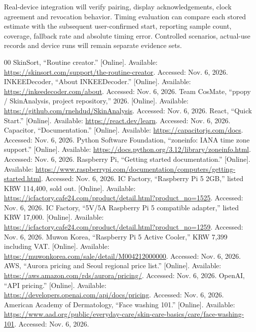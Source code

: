\documentclass[conference,letterpaper]{IEEEtran}
\begin{document}
Real-device integration will verify pairing, display acknowledgements, clock agreement and revocation behavior. Timing evaluation can compare each stored estimate with the subsequent user-confirmed start, reporting sample count, coverage, fallback rate and absolute timing error. Controlled scenarios, actual-use records and device runs will remain separate evidence sets.
\begin{thebibliography}{00}
 SkinSort, ``Routine creator.'' [Online]. Available: \url{https://skinsort.com/support/the-routine-creator}. Accessed: Nov. 6, 2026.
 INKEEDecoder, ``About INKEEDecoder.'' [Online]. Available: \url{https://inkeedecoder.com/about}. Accessed: Nov. 6, 2026.
 Team CosMate, ``ppopy / SkinAnalysis, project repository,'' 2026. [Online]. Available: \url{https://github.com/rnehdud/SkinAnalysis}. Accessed: Nov. 6, 2026.
 React, ``Quick Start.'' [Online]. Available: \url{https://react.dev/learn}. Accessed: Nov. 6, 2026.
 Capacitor, ``Documentation.'' [Online]. Available: \url{https://capacitorjs.com/docs}. Accessed: Nov. 6, 2026.
 Python Software Foundation, ``zoneinfo: IANA time zone support.'' [Online]. Available: \url{https://docs.python.org/3.12/library/zoneinfo.html}. Accessed: Nov. 6, 2026.
 Raspberry Pi, ``Getting started documentation.'' [Online]. Available: \url{https://www.raspberrypi.com/documentation/computers/getting-started.html}. Accessed: Nov. 6, 2026.
 IC Factory, ``Raspberry Pi 5 2GB,'' listed KRW 114,400, sold out. [Online]. Available: \url{https://icfactory.cafe24.com/product/detail.html?product_no=1525}. Accessed: Nov. 6, 2026.
 IC Factory, ``5V/5A Raspberry Pi 5 compatible adapter,'' listed KRW 17,000. [Online]. Available: \url{https://icfactory.cafe24.com/product/detail.html?product_no=1259}. Accessed: Nov. 6, 2026.
 Muwon Korea, ``Raspberry Pi 5 Active Cooler,'' KRW 7,399 including VAT. [Online]. Available: \url{https://muwonkorea.com/sale/detail/M004212000000}. Accessed: Nov. 6, 2026.
 AWS, ``Aurora pricing and Seoul regional price list.'' [Online]. Available: \url{https://aws.amazon.com/rds/aurora/pricing/}. Accessed: Nov. 6, 2026.
 OpenAI, ``API pricing.'' [Online]. Available: \url{https://developers.openai.com/api/docs/pricing}. Accessed: Nov. 6, 2026.
 American Academy of Dermatology, ``Face washing 101.'' [Online]. Available: \url{https://www.aad.org/public/everyday-care/skin-care-basics/care/face-washing-101}. Accessed: Nov. 6, 2026.
\end{thebibliography}
\end{document}
